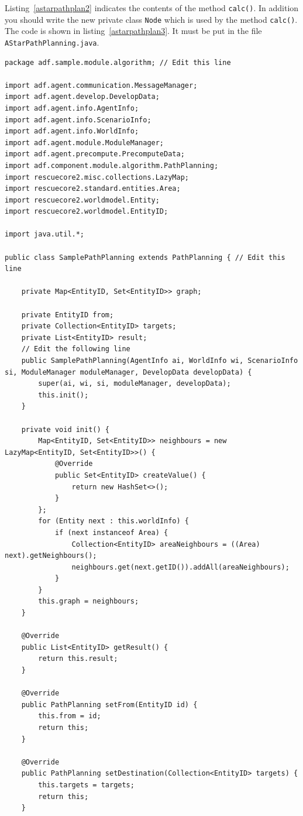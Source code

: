 \documentclass{article}
\begin{document}
Listing~\ref{astarpathplan2} indicates the contents of the method
\texttt{calc()}. In addition you should write the new private class \texttt{Node} which is used by the method \texttt{calc()}. The code is shown in listing~\ref{astarpathplan3}. It must be put in the file \texttt{AStarPathPlanning.java}.
\begin{lstlisting}[caption=SamplePathPlanning.java,label=samplepathplan]
package adf.sample.module.algorithm; // Edit this line

import adf.agent.communication.MessageManager;
import adf.agent.develop.DevelopData;
import adf.agent.info.AgentInfo;
import adf.agent.info.ScenarioInfo;
import adf.agent.info.WorldInfo;
import adf.agent.module.ModuleManager;
import adf.agent.precompute.PrecomputeData;
import adf.component.module.algorithm.PathPlanning;
import rescuecore2.misc.collections.LazyMap;
import rescuecore2.standard.entities.Area;
import rescuecore2.worldmodel.Entity;
import rescuecore2.worldmodel.EntityID;

import java.util.*;

public class SamplePathPlanning extends PathPlanning { // Edit this line

    private Map<EntityID, Set<EntityID>> graph;

    private EntityID from;
    private Collection<EntityID> targets;
    private List<EntityID> result;
    // Edit the following line
    public SamplePathPlanning(AgentInfo ai, WorldInfo wi, ScenarioInfo si, ModuleManager moduleManager, DevelopData developData) {
        super(ai, wi, si, moduleManager, developData);
        this.init();
    }

    private void init() {
        Map<EntityID, Set<EntityID>> neighbours = new LazyMap<EntityID, Set<EntityID>>() {
            @Override
            public Set<EntityID> createValue() {
                return new HashSet<>();
            }
        };
        for (Entity next : this.worldInfo) {
            if (next instanceof Area) {
                Collection<EntityID> areaNeighbours = ((Area) next).getNeighbours();
                neighbours.get(next.getID()).addAll(areaNeighbours);
            }
        }
        this.graph = neighbours;
    }

    @Override
    public List<EntityID> getResult() {
        return this.result;
    }

    @Override
    public PathPlanning setFrom(EntityID id) {
        this.from = id;
        return this;
    }

    @Override
    public PathPlanning setDestination(Collection<EntityID> targets) {
        this.targets = targets;
        return this;
    }


\end{lstlisting}
\end{document}
